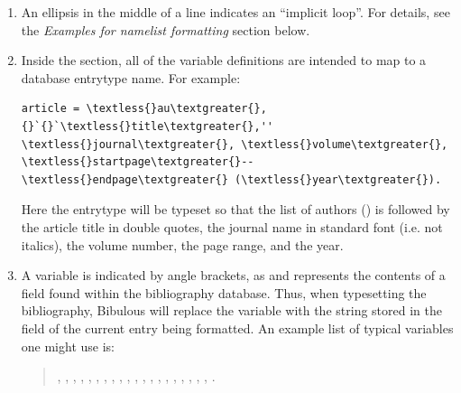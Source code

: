\documentclass[letterpaper,10pt,english]{sphinxmanual}
\begin{document}
\begin{enumerate}
\item {} 
An ellipsis in the middle of a line indicates an ``implicit loop''. For details, see the \emph{Examples for namelist formatting} section below.

\item {} 
Inside the  section, all of the variable definitions are intended to map to a database entrytype name. For example:

\begin{Verbatim}[commandchars=\\\{\}]
article = \textless{}au\textgreater{}, {}`{}`\textless{}title\textgreater{},'' \textless{}journal\textgreater{}, \textless{}volume\textgreater{}, \textless{}startpage\textgreater{}--\textless{}endpage\textgreater{} (\textless{}year\textgreater{}).
\end{Verbatim}

Here the  entrytype will be typeset so that the list of authors () is followed by the article title in double quotes, the journal name in standard font (i.e. not italics), the volume number, the page range, and the year.

\item {} 
A variable is indicated by angle brackets, as  and represents the contents of a field found within the bibliography database. Thus, when typesetting the bibliography, Bibulous will replace the variable  with the string stored in the  field of the current entry being formatted. An example list of typical variables one might use is:
\begin{quote}

, , , , , , , , , , , , , , , , , , , , .
\end{quote}


\end{enumerate}
\end{document}
